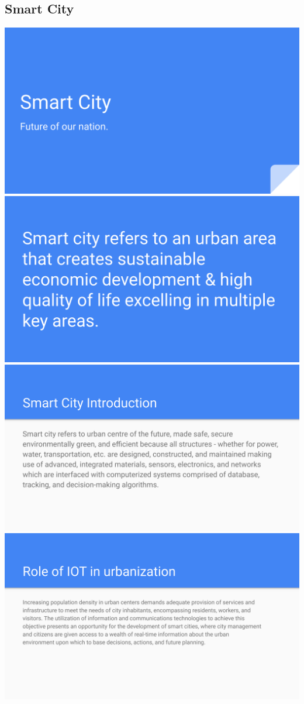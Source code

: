 \documentclass[17pt,a4paper,oneside,margin=1in]{article}
\begin{document}
\subsection{Smart City}
\begin{center}
	\includegraphics[width=0.7\linewidth]{./scrot/smart-city-0.png}
	\includegraphics[width=0.7\linewidth]{./scrot/smart-city-1.png}
	\includegraphics[width=0.7\linewidth]{./scrot/smart-city-2.png}
	\includegraphics[width=0.7\linewidth]{./scrot/smart-city-3.png}
\end{center}
\end{document}
